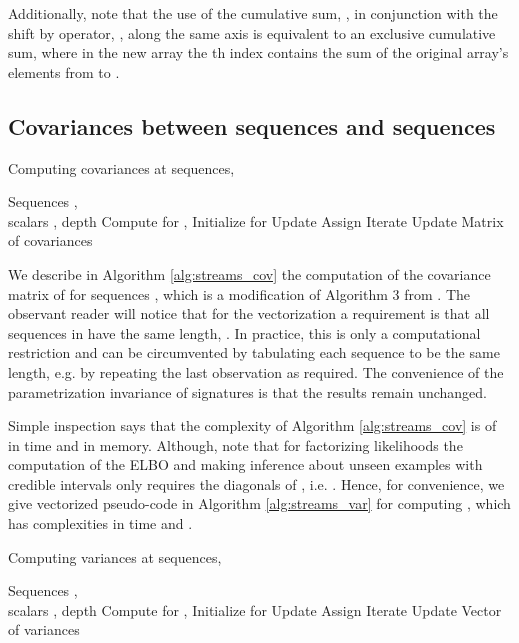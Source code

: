 \documentclass{article}
\begin{document}
  Additionally, note that the use of the cumulative sum, , in conjunction with the shift by  operator, , along the same axis is equivalent to an exclusive cumulative sum, where in the new array the th index contains the sum of the original array's elements from  to .
  
  \subsection{Covariances between sequences and sequences} \label{app:stream_covs}
  
  \begin{algorithm}[h]
  	\caption{Computing covariances at sequences, }
  	\label{alg:streams_cov}
  	\begin{algorithmic}[1]
  		 Sequences , \\ scalars , depth  
  		\STATE Compute  for ,  
  		\STATE Initialize  for 
  		\STATE Update 
  		\STATE Assign 
  		\STATE Iterate 
  		\STATE Update 
  		\ENDFOR
  		 Matrix of covariances 
  	\end{algorithmic}
  \end{algorithm}

  We describe in Algorithm \ref{alg:streams_cov} the computation of the covariance matrix  of  for sequences , which is a modification of Algorithm 3 from \cite{KiralyOberhauser2019KSig}. The observant reader will notice that for the vectorization a requirement is that all sequences in  have the same length, . In practice, this is only a computational restriction and can be circumvented by tabulating each sequence to be the same length, e.g. by repeating the last observation as required. The convenience of the parametrization invariance of signatures is that the results remain unchanged.
  
  Simple inspection says that the complexity of Algorithm \ref{alg:streams_cov} is of  in time and  in memory. Although, note that for factorizing likelihoods the computation of the ELBO and making inference about unseen examples  with credible intervals only requires the diagonals of , i.e. . Hence, for convenience, we give vectorized pseudo-code in Algorithm \ref{alg:streams_var} for computing , which has complexities  in time and .
  
  \begin{algorithm}[h]
  	\caption{Computing variances at sequences, }
  	\label{alg:streams_var}
  	\begin{algorithmic}[1]
  		 Sequences , \\ scalars , depth  
  		\STATE Compute  for ,  
  		\STATE Initialize  for 
  		\STATE Update 
  		\STATE Assign 
  		\STATE Iterate 
  		\STATE Update 
  		\ENDFOR
  		 Vector of variances 
  	\end{algorithmic}
  \end{algorithm}
\end{document}
